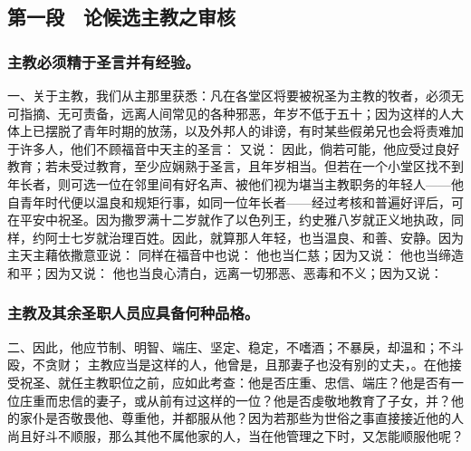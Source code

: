 
\subsection{第一段　论候选主教之审核}


\subsubsection{主教必须精于圣言并有经验。}

一、关于主教，我们从主那里获悉：凡在各堂区将要被祝圣为主教的牧者，必须无可指摘、无可责备，远离人间常见的各种邪恶，年岁不低于五十；因为这样的人大体上已摆脱了青年时期的放荡，以及外邦人的诽谤，有时某些假弟兄也会将责难加于许多人，他们不顾福音中天主的圣言： 又说： 因此，倘若可能，他应受过良好教育；若未受过教育，至少应娴熟于圣言，且年岁相当。但若在一个小堂区找不到年长者，则可选一位在邻里间有好名声、被他们视为堪当主教职务的年轻人——他自青年时代便以温良和规矩行事，如同一位年长者——经过考核和普遍好评后，可在平安中祝圣。因为撒罗满十二岁就作了以色列王，约史雅八岁就正义地执政，同样，约阿士七岁就治理百姓。因此，就算那人年轻，也当温良、和善、安静。因为主天主藉依撒意亚说： 同样在福音中也说： 他也当仁慈；因为又说： 他也当缔造和平；因为又说： 他也当良心清白，远离一切邪恶、恶毒和不义；因为又说：\par


\subsubsection{主教及其余圣职人员应具备何种品格。}

二、因此，他应节制、明智、端庄、坚定、稳定，不嗜酒；不暴戾，却温和；不斗殴，不贪财； 主教应当是这样的人，他曾是，且那妻子也没有别的丈夫，。在他接受祝圣、就任主教职位之前，应如此考查：他是否庄重、忠信、端庄？他是否有一位庄重而忠信的妻子，或从前有过这样的一位？他是否虔敬地教育了子女，并？他的家仆是否敬畏他、尊重他，并都服从他？因为若那些为世俗之事直接接近他的人尚且好斗不顺服，那么其他不属他家的人，当在他管理之下时，又怎能顺服他呢？\par

